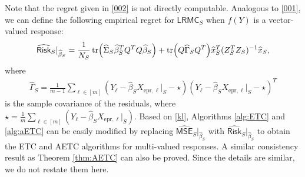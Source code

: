 \documentclass[a4paper,11pt]{article}
\numberwithin{equation}{section}
\theoremstyle{plain}
\theoremstyle{definition}
\def\ex{{\text{epr}}}
\def\mse{{\textsf{MSE}}}
\def\risk{{\textsf{Risk}}}
\def\lrmc{{\textsf{LRMC}}}
\begin{document}
Note that the regret given in \eqref{002} is not directly computable.
Analogous to \eqref{001}, we can define the following empirical regret for $\lrmc_S$ when $f(Y)$ is a vector-valued response: 
\begin{align}
\widehat{\risk}_S|_{\widehat{\beta}_S} = \frac{1}{N_S}\tr(\widehat{\Sigma}_S\widehat{\beta}_S^TQ^TQ\widehat{\beta}_S) + \tr(Q\widehat{\Gamma}_SQ^T)\widehat{x}_S^T(Z_S^TZ_S)^{-1}\widehat{x}_S,\label{kl}
\end{align}
where 
\begin{align}
\widehat{\Gamma}_S = \frac{1}{m-1}\sum_{\ell\in [m]}\left(Y_\ell - \widehat{\beta}_SX_{\ex,\ell}|_S -\star\right)\left(Y_\ell - \widehat{\beta}_SX_{\ex,\ell}|_S -\star\right)^T \label{rep-noise}
\end{align}
is the sample covariance of the residuals, where $\star = \frac{1}{m}\sum_{\ell\in [m]}(Y_\ell - \widehat{\beta}_SX_{\ex,\ell}|_S)$.
Based on \eqref{kl}, Algorithms \ref{alg:ETC} and \ref{alg:aETC} can be easily modified by replacing $\widehat{\mse}_S|_{\widehat{\beta}_S}$ with $\widehat{\risk}_S|_{\widehat{\beta}_S}$ to obtain the ETC and AETC algorithms for multi-valued responses.  A similar consistency result as Theorem \ref{thm:AETC} can also be proved. 
Since the details are similar, we do not restate them here.  


\end{document}
